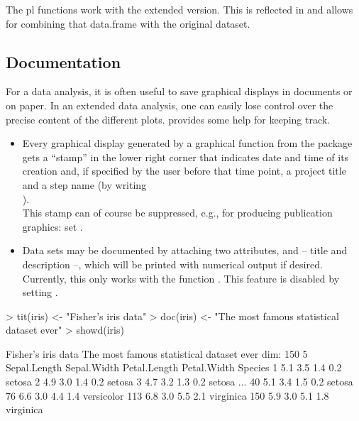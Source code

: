 \documentclass[11pt]{article}
\begin{document}
The pl functions  work with the extended
version. This is reflected in  and allows for
combining that data.frame with the original dataset.

\subsection{Documentation}
For a data analysis, it is often useful to save graphical displays in 
documents or on paper. In an extended data analysis, one can easily lose
control over the precise content of the different plots.
 provides some help for keeping track.
\begin{itemize}
\item 
  Every graphical display generated by a graphical function from the
  package gets a ``stamp'' in the lower right corner that indicates date
  and time of its creation and, if specified by the user before that 
  time point, a project title and a step name (by writing\\
  ).\\
  This stamp can of course be suppressed, e.g., for producing publication
  graphics: set \Hneed{40mm} .
\item
  Data sets may be documented by attaching two attributes,  and 
   -- title and description --, which will be printed with
  numerical output if desired.
  Currently, this only works with the function .
  This feature is disabled by setting .
\end{itemize}
\begin{Schunk}
\begin{Sinput}
>   tit(iris) <- "Fisher's iris data"
>   doc(iris) <- "The most famous statistical dataset ever"
>   showd(iris)
\end{Sinput}
\begin{Soutput}
Fisher's iris data 
   The most famous statistical dataset ever
dim:  150 5 
    Sepal.Length Sepal.Width Petal.Length Petal.Width    Species
1            5.1         3.5          1.4         0.2     setosa
2            4.9         3.0          1.4         0.2     setosa
3            4.7         3.2          1.3         0.2     setosa
...                                                             
40           5.1         3.4          1.5         0.2     setosa
76           6.6         3.0          4.4         1.4 versicolor
113          6.8         3.0          5.5         2.1  virginica
150          5.9         3.0          5.1         1.8  virginica
\end{Soutput}
\end{Schunk}
\end{document}
